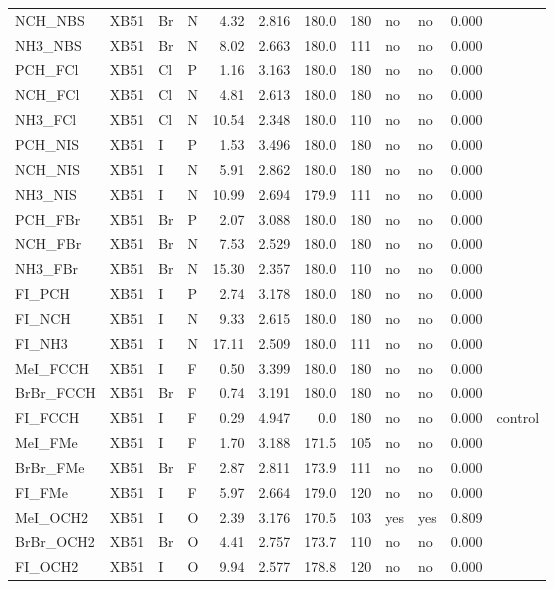 {\begin{longtable}{llllrrrrllrl}
NCH\_NBS & XB51 & Br & N & 4.32 & 2.816 & 180.0 & 180 & no & no & 0.000 & \\
NH3\_NBS & XB51 & Br & N & 8.02 & 2.663 & 180.0 & 111 & no & no & 0.000 & \\
PCH\_FCl & XB51 & Cl & P & 1.16 & 3.163 & 180.0 & 180 & no & no & 0.000 & \\
NCH\_FCl & XB51 & Cl & N & 4.81 & 2.613 & 180.0 & 180 & no & no & 0.000 & \\
NH3\_FCl & XB51 & Cl & N & 10.54 & 2.348 & 180.0 & 110 & no & no & 0.000 & \\
PCH\_NIS & XB51 & I & P & 1.53 & 3.496 & 180.0 & 180 & no & no & 0.000 & \\
NCH\_NIS & XB51 & I & N & 5.91 & 2.862 & 180.0 & 180 & no & no & 0.000 & \\
NH3\_NIS & XB51 & I & N & 10.99 & 2.694 & 179.9 & 111 & no & no & 0.000 & \\
PCH\_FBr & XB51 & Br & P & 2.07 & 3.088 & 180.0 & 180 & no & no & 0.000 & \\
NCH\_FBr & XB51 & Br & N & 7.53 & 2.529 & 180.0 & 180 & no & no & 0.000 & \\
NH3\_FBr & XB51 & Br & N & 15.30 & 2.357 & 180.0 & 110 & no & no & 0.000 & \\
FI\_PCH & XB51 & I & P & 2.74 & 3.178 & 180.0 & 180 & no & no & 0.000 & \\
FI\_NCH & XB51 & I & N & 9.33 & 2.615 & 180.0 & 180 & no & no & 0.000 & \\
FI\_NH3 & XB51 & I & N & 17.11 & 2.509 & 180.0 & 111 & no & no & 0.000 & \\
MeI\_FCCH & XB51 & I & F & 0.50 & 3.399 & 180.0 & 180 & no & no & 0.000 & \\
BrBr\_FCCH & XB51 & Br & F & 0.74 & 3.191 & 180.0 & 180 & no & no & 0.000 & \\
FI\_FCCH & XB51 & I & F & 0.29 & 4.947 & 0.0 & 180 & no & no & 0.000 & control\\
MeI\_FMe & XB51 & I & F & 1.70 & 3.188 & 171.5 & 105 & no & no & 0.000 & \\
BrBr\_FMe & XB51 & Br & F & 2.87 & 2.811 & 173.9 & 111 & no & no & 0.000 & \\
FI\_FMe & XB51 & I & F & 5.97 & 2.664 & 179.0 & 120 & no & no & 0.000 & \\
MeI\_OCH2 & XB51 & I & O & 2.39 & 3.176 & 170.5 & 103 & yes & yes & 0.809 & \\
BrBr\_OCH2 & XB51 & Br & O & 4.41 & 2.757 & 173.7 & 110 & no & no & 0.000 & \\
FI\_OCH2 & XB51 & I & O & 9.94 & 2.577 & 178.8 & 120 & no & no & 0.000 & \\

\end{longtable}}
